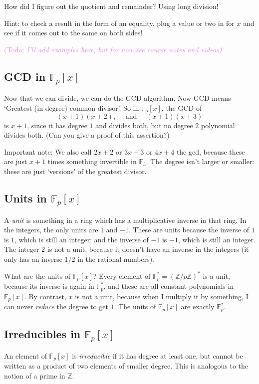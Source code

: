\documentclass{article}
\theoremstyle{plain}
\theoremstyle{definition}
\theoremstyle{remark}
\numberwithin{theorem}{section}
\newcommand{\KS}[1]{\textcolor{violet}{{\sf (Todo:} {\sl{#1})}}}
\newcommand{\KS}[1]{}
\newcommand{\FF}{\mathbb{F}}
\newcommand{\ZZ}{\mathbb{Z}}
\begin{document}
How did I figure out the quotient and remainder?  Using long division!

Hint:  to check a result in the form of an equality, plug a value or two in for $x$ and see if it comes out to the same on both sides!

\KS{I'll add examples here, but for now see course notes and videos}

\subsection{GCD in $\FF_p[x]$}

Now that we can divide, we can do the GCD algorithm.  Now GCD means `Greatest (in degree) common divisor'.  So in $\FF_5[x]$, the GCD of
\[
(x+1)(x+2), \quad \text{ and } \quad (x+1)(x+3)
\]
is $x+1$, since it has degree $1$ and divides both, but no degree $2$ polynomial divides both.  (Can you give a proof of this assertion?)

Important note:  We also call $2x+2$ or $3x+3$ or $4x+4$ the gcd, because these are just $x+1$ times something invertible in $\FF_5$.  The degree isn't larger or smaller:  these are just `versions' of the greatest divisor.

\subsection{Units in $\FF_p[x]$}

A \emph{unit} is something in a ring which has a multiplicative inverse in that ring.  In the integers, the only units are $1$ and $-1$.  These are units because the inverse of $1$ is $1$, which is still an integer; and the inverse of $-1$ is $-1$, which is still an integer.  The integer $2$ is not a unit, because it doesn't have an inverse in the integers (it only has an inverse $1/2$ in the rational numbers).

What are the units of $\FF_p[x]$?  Every element of $\FF_p^* = (\ZZ/p\ZZ)^*$ is a unit, because its inverse is again in $\FF_p^*$, and these are all constant polynomials in $\FF_p[x]$.  By contrast, $x$ is not a unit, because when I multiply it by something, I can never \emph{reduce} the degree to get $1$.  The units of $\FF_p[x]$ are exactly $\FF_p^*$.

\subsection{Irreducibles in $\FF_p[x]$}

An element of $\FF_p[x]$ is \emph{irreducible} if it has degree at least one, but cannot be written as a product of two elements of smaller degree.  This is analogous to the notion of a prime in $\ZZ$.
\end{document}
